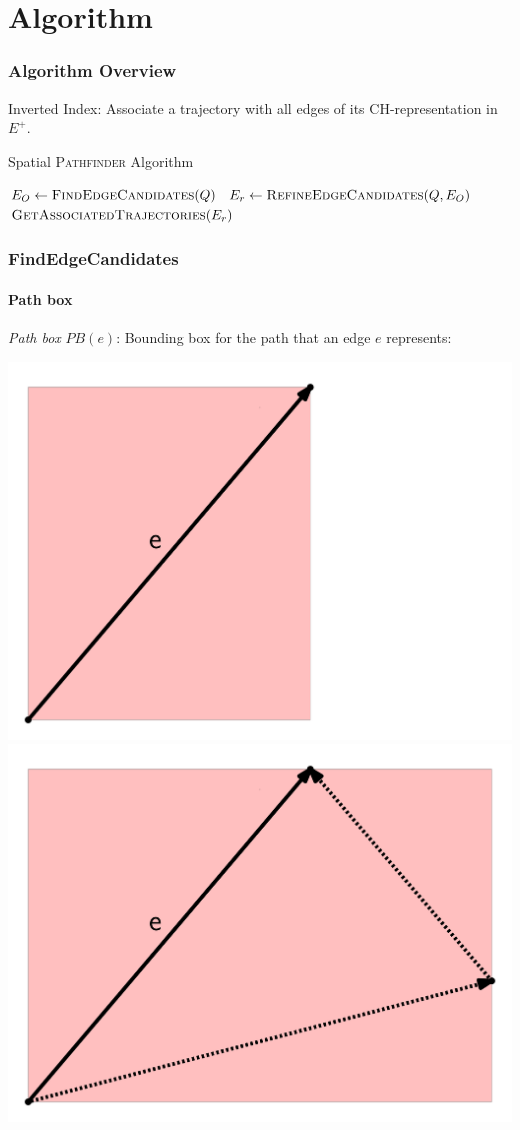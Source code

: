 \documentclass[10pt, t,
aspectratio=169,%
]{beamer}
\newcommand{\pathfinder}{\textsc{Pathfinder}\xspace}
\newcommand{\findEdgeCandidates}{FindEdgeCandidates\xspace}
\newcommand{\refineEdgeCandidates}{RefineEdgeCandidates\xspace}
\newcommand{\getAssociatedTrajectories}{GetAssociatedTrajectories\xspace}
\newcommand{\chrep}{CH-representation\xspace}
\begin{document}
\section{Algorithm}

\begin{frame}
	\frametitle{Algorithm Overview}
	Inverted Index: Associate a trajectory with all edges of its \chrep in $E^+$. \pause
	\begin{algorithm}[H]
		\renewcommand{\thealgorithm}{}
		{\small
			\caption{Spatial \pathfinder Algorithm}
			\begin{algorithmic}[1]
				 \pause
				\State $E_O \gets \Call{\findEdgeCandidates}{Q}$ \label{line:edge_revrieval} \pause
				\State $E_r \gets \Call{\refineEdgeCandidates}{Q, E_O}$ \pause
				\State \Return $\Call{\getAssociatedTrajectories}{E_r}$
				\EndProcedure
			\end{algorithmic}
			\label{alg:spatial_pathfinder}
		}
	\end{algorithm}
\end{frame}

\begin{frame}
	\frametitle{\findEdgeCandidates}
	\framesubtitle{Path box}
	\emph{Path box} $PB(e)$: Bounding box for the path that an edge $e$ represents:

	\includegraphics[width=.45\columnwidth]{images/simplePathBox} \pause
	\includegraphics[width=.45\columnwidth]{images/pathBox}
\end{frame}
\end{document}
